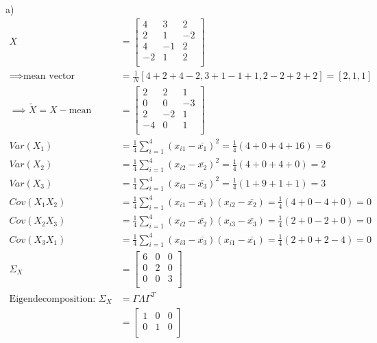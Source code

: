 %
%
%
\begin{flushleft}
a)
\begin{align*}
X &=
\begin{bmatrix}
4 & 3 & 2 \\
2 & 1 & -2 \\
4 & -1 & 2 \\
-2 & 1 & 2 \\
\end{bmatrix}
\\
\implies \text{mean vector} &= \frac{1}{N}
[4 + 2 + 4 - 2, 3 + 1 - 1 + 1, 2 - 2 + 2 + 2] = [2, 1, 1]\\
\implies \widetilde{X} = X - \text{mean} &=
\begin{bmatrix}
2 & 2 & 1 \\
0 & 0 & -3 \\
2 & -2 & 1 \\
-4 & 0 & 1 \\
\end{bmatrix}
\\
Var(X_{1}) &= \frac{1}{4} \sum_{i=1}^{4}(x_{i1} - 
\bar{x_{1}})^2 = \frac{1}{4}(4 + 0 + 4 + 16) = 6
\\
Var(X_{2}) &= \frac{1}{4} \sum_{i=1}^{4}(x_{i2} - 
\bar{x_{2}})^2 = \frac{1}{4}(4 + 0 + 4 + 0) = 2
\\
Var(X_{3}) &= \frac{1}{4} \sum_{i=1}^{4}(x_{i3} - 
\bar{x_{3}})^2 = \frac{1}{4}(1 + 9 + 1 + 1) = 3
\\
Cov(X_{1}X_{2}) &= \frac{1}{4} \sum_{i=1}^{4}(x_{i1} - \bar{x_{1}}) 
(x_{i2} - \bar{x_{2}}) = \frac{1}{4} ( 4 + 0 - 4 + 0) = 0
\\
Cov(X_{2}X_{3}) &= \frac{1}{4} \sum_{i=1}^{4}(x_{i2} - \bar{x_{2}}) 
(x_{i3} - \bar{x_{3}}) = \frac{1}{4} ( 2 + 0 - 2 + 0) = 0
\\
Cov(X_{3}X_{1}) &= \frac{1}{4} \sum_{i=1}^{4}(x_{i3} - \bar{x_{3}}) 
(x_{i1} - \bar{x_{1}}) = \frac{1}{4} ( 2 + 0 + 2 - 4) = 0
\\
\Sigma_{X} &= 
\begin{bmatrix}
6 & 0 & 0 \\
0 & 2 & 0 \\
0 & 0 & 3 \\
\end{bmatrix}
\\
\text{Eigendecomposition: }
\Sigma_{X} &= \Gamma \Lambda \Gamma^{T}
\\
&= 
\begin{bmatrix}
1 & 0 & 0 \\
0 & 1 & 0 \\

\end{bmatrix}
\end{align*}
\end{flushleft}
